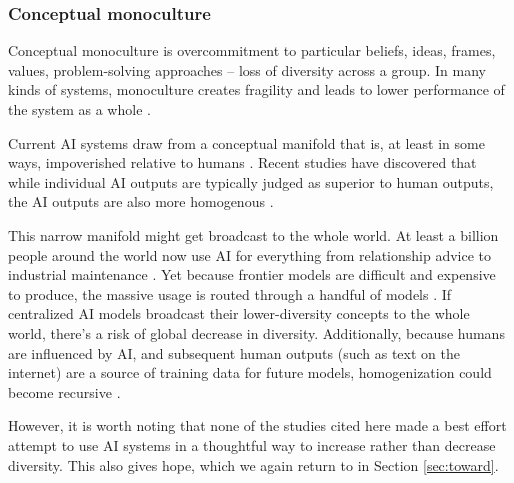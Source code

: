 \documentclass[12pt]{article}
\begin{document}
\subsubsection{Conceptual monoculture}

Conceptual monoculture is overcommitment to particular beliefs, ideas, frames, values, problem-solving approaches -- loss of diversity across a group. In many kinds of systems, monoculture creates fragility and leads to lower performance of the system as a whole \citep{tilman1996biodiversity, kleinberg2021algorithmic,scott1998seeing, haldane2013rethinking}. 

Current AI systems draw from a conceptual manifold that is, at least in some ways, impoverished relative to humans \citep{messeri2024artificial, crawford2021atlas, selwyn2024limits, kirk2023understanding}. Recent studies have discovered that while individual AI outputs are typically judged as superior to human outputs, the AI outputs are also more homogenous \citep{doshi2024generative, beguvs2024experimental, zhou2024generative, kosmyna2025your, agarwal2025ai, padmakumar2023does, xu2025echoes}. 

This narrow manifold might get broadcast to the whole world. At least a billion people around the world now use AI for everything from relationship advice to industrial maintenance \citep{chatterji2025chatgpt, mckinsey2025stateofai, openai2025enterprise, mccain2025claude, honeywell2024google, techcrunch2025sam, ccia2025survey}. Yet because frontier models are difficult and expensive to produce, the massive usage is routed through a handful of models \citep{bommasani2021opportunities}. If centralized AI models broadcast their lower-diversity concepts to the whole world, there's a risk of global decrease in diversity. Additionally, because humans are influenced by AI, and subsequent human outputs (such as text on the internet) are a source of training data for future models, homogenization could become recursive \citep{chaney2018algorithmic}. 


However, it is worth noting that none of the studies cited here made a best effort attempt to use AI systems in a thoughtful way to increase rather than decrease diversity. This also gives hope, which we again return to in Section \ref{sec:toward}.


\end{document}
